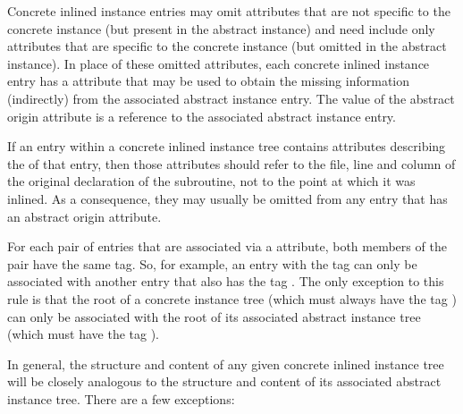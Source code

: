 Concrete inlined instance entries may omit attributes that
are not specific to the concrete instance (but present in
the abstract instance) and need include only attributes that
are specific to the concrete instance (but omitted in the
abstract instance). In place of these omitted attributes, 
each\hypertarget{chap:DWATabstractorigininlineinstance}{}
concrete inlined instance entry has a
\DWATabstractoriginDEFN{}
attribute that may be used to obtain the missing information
(indirectly) from the associated abstract instance entry. The
value of the abstract origin attribute is a reference to the
associated abstract instance entry.

If an entry within a concrete inlined instance tree contains
attributes describing the 
of that entry, then those attributes should refer to the file, line
and column of the original declaration of the subroutine,
not to the point at which it was inlined. As a consequence,
they may usually be omitted from any entry that has an abstract
origin attribute.

For each pair of entries that are associated via a
\DWATabstractorigin{} attribute, both members of the pair
have the same tag. So, for example, an entry with the tag
\DWTAGvariable{} can only be associated with another entry
that also has the tag \DWTAGvariable. The only exception
to this rule is that the root of a concrete instance tree
(which must always have the tag \DWTAGinlinedsubroutine)
can only be associated with the root of its associated abstract
instance tree (which must have the tag \DWTAGsubprogram).

In general, the structure and content of any given concrete
inlined instance tree will be closely analogous to the
structure and content of its associated abstract instance
tree. There are a few exceptions:

